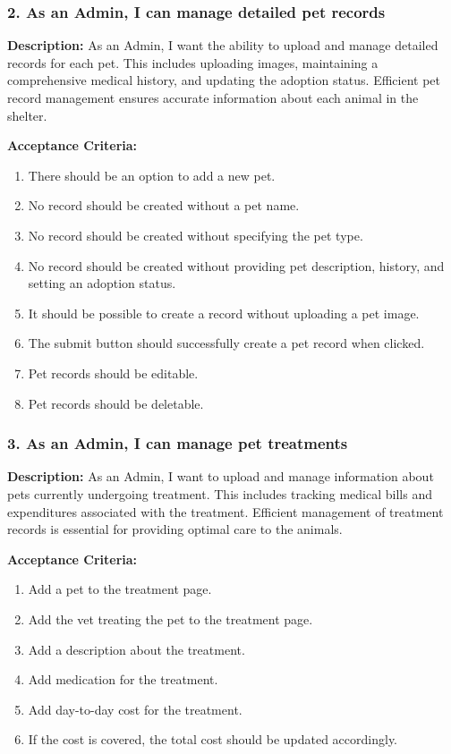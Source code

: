 \subsubsection*{2. As an Admin, I can manage detailed pet records}
\textbf{Description:} As an Admin, I want the ability to upload and manage detailed records for each pet. This includes uploading images, maintaining a comprehensive medical history, and updating the adoption status. Efficient pet record management ensures accurate information about each animal in the shelter.

\textbf{Acceptance Criteria:}
    \begin{enumerate}
    \item There should be an option to add a new pet.
    \item No record should be created without a pet name.
    \item No record should be created without specifying the pet type.
    \item No record should be created without providing pet description, history, and setting an adoption status.
    \item It should be possible to create a record without uploading a pet image.
    \item The submit button should successfully create a pet record when clicked.
    \item Pet records should be editable.
    \item Pet records should be deletable.
\end{enumerate}

\subsubsection*{3. As an Admin, I can manage pet treatments}
\textbf{Description:} As an Admin, I want to upload and manage information about pets currently undergoing treatment. This includes tracking medical bills and expenditures associated with the treatment. Efficient management of treatment records is essential for providing optimal care to the animals.

\textbf{Acceptance Criteria:}
\begin{enumerate}
    \item Add a pet to the treatment page.
    \item Add the vet treating the pet to the treatment page.
    \item Add a description about the treatment.
    \item Add medication for the treatment.
    \item Add day-to-day cost for the treatment.
    \item If the cost is covered, the total cost should be updated accordingly.
\end{enumerate}

